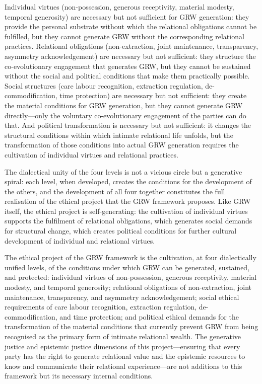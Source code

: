 Individual virtues (non-possession, generous receptivity, material modesty, temporal generosity) are necessary but not sufficient for GRW generation: they provide the personal substrate without which the relational obligations cannot be fulfilled, but they cannot generate GRW without the corresponding relational practices. Relational obligations (non-extraction, joint maintenance, transparency, asymmetry acknowledgement) are necessary but not sufficient: they structure the co-evolutionary engagement that generates GRW, but they cannot be sustained without the social and political conditions that make them practically possible. Social structures (care labour recognition, extraction regulation, de-commodification, time protection) are necessary but not sufficient: they create the material conditions for GRW generation, but they cannot generate GRW directly---only the voluntary co-evolutionary engagement of the parties can do that. And political transformation is necessary but not sufficient: it changes the structural conditions within which intimate relational life unfolds, but the transformation of those conditions into actual GRW generation requires the cultivation of individual virtues and relational practices.

The dialectical unity of the four levels is not a vicious circle but a generative spiral: each level, when developed, creates the conditions for the development of the others, and the development of all four together constitutes the full realisation of the ethical project that the GRW framework proposes. Like GRW itself, the ethical project is self-generating: the cultivation of individual virtues supports the fulfilment of relational obligations, which generates social demands for structural change, which creates political conditions for further cultural development of individual and relational virtues.

\begin{claim}
The ethical project of the GRW framework is the cultivation, at four dialectically unified levels, of the conditions under which GRW can be generated, sustained, and protected: individual virtues of non-possession, generous receptivity, material modesty, and temporal generosity; relational obligations of non-extraction, joint maintenance, transparency, and asymmetry acknowledgement; social ethical requirements of care labour recognition, extraction regulation, de-commodification, and time protection; and political ethical demands for the transformation of the material conditions that currently prevent GRW from being recognised as the primary form of intimate relational wealth. The generative justice and epistemic justice dimensions of this project---ensuring that every party has the right to generate relational value and the epistemic resources to know and communicate their relational experience---are not additions to this framework but its necessary internal conditions.
\end{claim}
